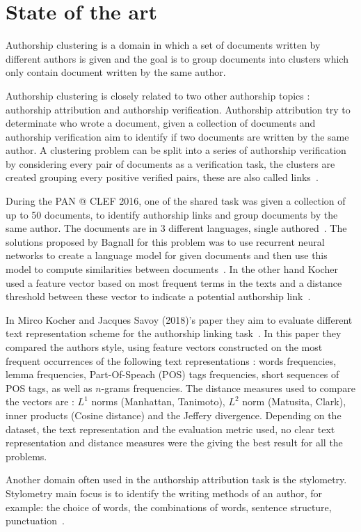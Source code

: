 \section{State of the art \label{sec:state_of_the_art}}

Authorship clustering is a domain in which a set of documents written by different authors is given and the goal is to group documents into clusters which only contain document written by the same author.

Authorship clustering is closely related to two other authorship topics : authorship attribution and authorship verification.
Authorship attribution try to determinate who wrote a document, given a collection of documents and authorship verification aim to identify if two documents are written by the same author.
A clustering problem can be split into a series of authorship verification by considering every pair of documents as a verification task, the clusters are created grouping every positive verified pairs, these are also called links~\cite{pan16_clustering_site}.

During the PAN @ CLEF 2016, one of the shared task was given a collection of up to 50 documents, to identify authorship links and group documents by the same author.
The documents are in 3 different languages, single authored~\cite{pan16}.
The solutions proposed by Bagnall for this problem was to use recurrent neural networks to create a language model for given documents and then use this model to compute similarities between documents~\cite{bagnall_pan16}.
In the other hand Kocher used a feature vector based on most frequent terms in the texts and a distance threshold between these vector to indicate a potential authorship link~\cite{kocher_pan16}.

In Mirco Kocher and Jacques Savoy (2018)'s paper they aim to evaluate different text representation scheme for the authorship linking task~\cite{kocher_verification}.
In this paper they compared the authors style, using feature vectors constructed on the most frequent occurrences of the following text representations : words frequencies, lemma frequencies, Part-Of-Speach (POS) tags frequencies, short sequences of POS tags, as well as $n$-grams frequencies.
The distance measures used to compare the vectors are : $L^1$ norms (Manhattan, Tanimoto), $L^2$ norm (Matusita, Clark), inner products (Cosine distance) and the Jeffery divergence.
Depending on the dataset, the text representation and the evaluation metric used, no clear text representation and distance measures were the giving the best result for all the problems.

Another domain often used in the authorship attribution task is the stylometry.
Stylometry main focus is to identify the writing methods of an author, for example: the choice of words, the combinations of words, sentence structure, punctuation~\cite{savoy_stylo}.

